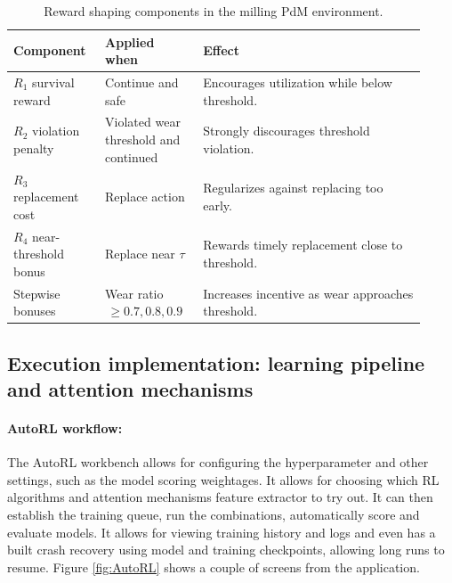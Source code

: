 \documentclass[sn-basic]{sn-jnl}%
\begin{document}
\begin{table}[htbp]
	\centering
	\caption{Reward shaping components in the milling PdM environment.}
	\label{tab:reward_components}
	\begin{tabular}{L{0.20\linewidth} L{0.22\linewidth} L{0.50\linewidth}}
		\toprule
		\textbf{Component} & \textbf{Applied when} & \textbf{Effect}\\
		\midrule
		$R_1$ survival reward & Continue and safe & Encourages utilization while below threshold.\\
		$R_2$ violation penalty & Violated wear threshold and continued & Strongly discourages threshold violation.\\
		$R_3$ replacement cost & Replace action & Regularizes against replacing too early.\\
		$R_4$ near-threshold bonus & Replace near $\tau$ & Rewards timely replacement close to threshold.\\
		Stepwise bonuses & Wear ratio $\,\ge 0.7, 0.8, 0.9$ & Increases incentive as wear approaches threshold.\\
		\bottomrule
	\end{tabular}
\end{table}

\subsection{Execution implementation: learning pipeline and attention mechanisms}\label{sec:algo_desc}
\paragraph{AutoRL workflow:}\label{sec:autorl}
The AutoRL workbench allows for configuring the hyperparameter and other settings, such as the model scoring weightages. It allows for choosing which RL algorithms and attention mechanisms feature extractor to try out. It can then establish the training queue, run the combinations, automatically score and evaluate models. It allows for viewing training history and logs and even has a built crash recovery using model and training checkpoints, allowing long runs to resume. Figure \ref{fig:AutoRL} shows a couple of screens from the application. 

\end{document}
